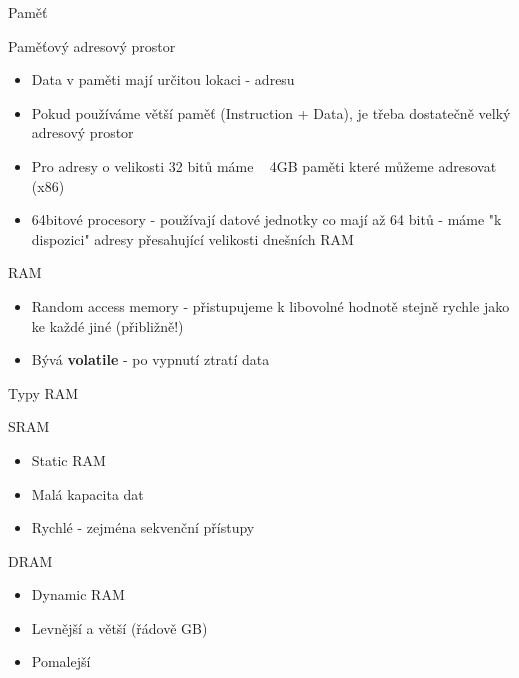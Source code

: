 \documentclass[9pt]{beamer}
\begin{document}
\begin{frame}{Paměť}
    \begin{block}{Paměťový adresový prostor}
        \begin{itemize}
            \item Data v paměti mají určitou lokaci - adresu
            \item Pokud používáme větší paměť (Instruction + Data), je třeba dostatečně velký adresový prostor \item Pro adresy o velikosti 32 bitů máme ~ 4GB paměti které můžeme adresovat (x86)
            \item 64bitové procesory - používají datové jednotky co mají až 64 bitů - máme "k dispozici" adresy přesahující velikosti dnešních RAM
        \end{itemize}
    \end{block}
    \pause
    \begin{block}{RAM}
    \begin{itemize}
        \item Random access memory - přistupujeme k libovolné hodnotě stejně rychle jako ke každé jiné (přibližně!)
        \item Bývá \textbf{volatile} - po vypnutí ztratí data
    \end{itemize}
    \end{block}
\end{frame}

\begin{frame}{Typy RAM}
    \begin{block}{SRAM}
    \begin{itemize}
        \item Static RAM
        \item Malá kapacita dat
        \item Rychlé - zejména sekvenční přístupy
    \end{itemize}
    \end{block}
    \pause
    \begin{block}{DRAM}
        \begin{itemize}
            \item Dynamic RAM
            \item Levnější a větší (řádově GB)
            \item Pomalejší
        \end{itemize}
    \end{block}
\end{frame}
\end{document}
